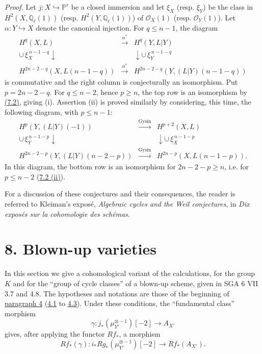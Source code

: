 \documentclass[11pt]{article}
\begin{document}
\emph{Proof.} Let $j:X\hookrightarrow\mathbb P^r$ be a closed immersion and let $\xi_X$ (resp. $\xi_Y$) be the class in $H^2(X,\mathbb Q_\ell(1))$ (resp. $H^2(Y,\mathbb Q_\ell(1))$) of $\mathcal O_X(1)$ (resp. $\mathcal O_Y(1)$). Let $\alpha:Y\hookrightarrow X$ denote the canonical injection. For $q\le n-1$, the diagram
\[
\begin{array}{ccc}
H^q(X,L)&\xrightarrow{\alpha^*}&H^q(Y,L|Y)\\
\cup\,\xi_X^{\,n-1-q}\downarrow&&\downarrow\cup\,\xi_Y^{\,n-1-q}\\
H^{2n-2-q}(X,L(n-1-q))&\xrightarrow{\alpha^*}&
H^{2n-2-q}(Y,(L|Y)(n-1-q))
\end{array}
\]
is commutative and the right column is conjecturally an isomorphism. Put $p=2n-2-q$. For $q\le n-2$, hence $p\ge n$, the top row is an isomorphism by \hyperref[sga5:VII:corollary:7.2]{(7.2)}, giving (i). Assertion (ii) is proved similarly by considering, this time, the following diagram, with $p\le n-1$:
\[
\begin{array}{ccc}
H^p(Y,(L|Y)(-1))&\xrightarrow{\mathrm{Gysin}}&H^{p+2}(X,L)\\
\cup\,\xi_Y^{\,n-1-p}\downarrow&&\downarrow\cup\,\xi_X^{\,n-1-p}\\
H^{2n-2-p}(Y,(L|Y)(n-2-p))&\xrightarrow{\mathrm{Gysin}}&
H^{2n-p}(X,L(n-1-p)).
\end{array}
\]
In this diagram, the bottom row is an isomorphism for $2n-2-p\ge n$, i.e. for $p\le n-2$ (\hyperref[sga5:VII:corollary:7.2]{7.2 (ii)}).

For a discussion of these conjectures and their consequences, the reader is referred to Kleiman's exposé, \emph{Algebraic cycles and the Weil conjectures}, in \emph{Dix exposés sur la cohomologie des schémas}.

\section*{8. Blown-up varieties}\label{sga5:VII:section:8}

In this section we give a cohomological variant of the calculations, for the group $K$ and for the ``group of cycle classes'' of a blown-up scheme, given in SGA 6 VII 3.7 and 4.8. The hypotheses and notations are those of the beginning of \hyperref[sga5:VII:section:4]{paragraph 4} (\hyperref[sga5:VII:theorem:4.1]{4.1} to \hyperref[sga5:VII:remark:4.3]{4.3}). Under these conditions, the ``fundamental class'' morphism
\[
\gamma:j_*(\mu_{Y'}^{\otimes -1})[-2]\to A_{X'}
\]
gives, after applying the functor $Rf_*$, a morphism
\[
Rf_*(\gamma):i_*Rg_*(\mu_{Y'}^{\otimes -1})[-2]\to Rf_*(A_{X'}).
\]
\end{document}

